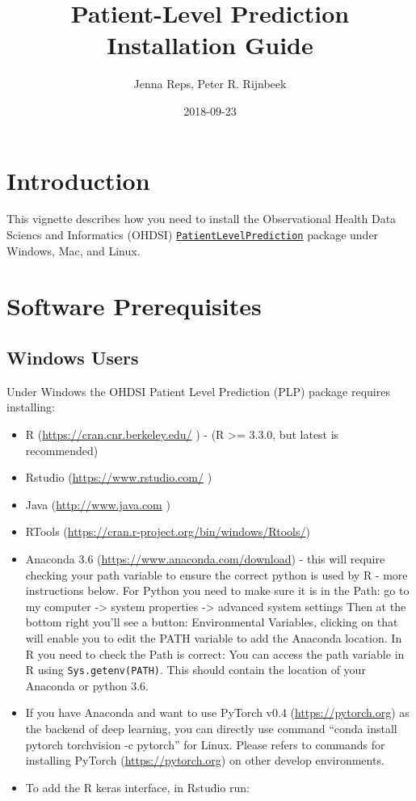 \documentclass[]{article}
\title{Patient-Level Prediction Installation Guide}
\author{Jenna Reps, Peter R. Rijnbeek}
\date{2018-09-23}
\providecommand{\tightlist}{%
  \setlength{\itemsep}{0pt}\setlength{\parskip}{0pt}}
\begin{document}
\maketitle

{
\setcounter{tocdepth}{2}
\tableofcontents
}
\section{Introduction}\label{introduction}

This vignette describes how you need to install the Observational Health
Data Sciencs and Informatics (OHDSI)
\href{http://github.com/OHDSI/PatientLevelPrediction}{\texttt{PatientLevelPrediction}}
package under Windows, Mac, and Linux.

\section{Software Prerequisites}\label{software-prerequisites}

\subsection{Windows Users}\label{windows-users}

Under Windows the OHDSI Patient Level Prediction (PLP) package requires
installing:

\begin{itemize}
\tightlist
\item
  R (\url{https://cran.cnr.berkeley.edu/} ) - (R \textgreater{}= 3.3.0,
  but latest is recommended)
\item
  Rstudio (\url{https://www.rstudio.com/} )
\item
  Java (\url{http://www.java.com} )
\item
  RTools (\url{https://cran.r-project.org/bin/windows/Rtools/})
\item
  Anaconda 3.6 (\url{https://www.anaconda.com/download}) - this will
  require checking your path variable to ensure the correct python is
  used by R - more instructions below. For Python you need to make sure
  it is in the Path: go to my computer -\textgreater{} system properties
  -\textgreater{} advanced system settings Then at the bottom right
  you'll see a button: Environmental Variables, clicking on that will
  enable you to edit the PATH variable to add the Anaconda location. In
  R you need to check the Path is correct: You can access the path
  variable in R using
  \texttt{Sys.getenv(\textquotesingle{}PATH\textquotesingle{})}. This
  should contain the location of your Anaconda or python 3.6.
\item
  If you have Anaconda and want to use PyTorch v0.4
  (\url{https://pytorch.org}) as the backend of deep learning, you can
  directly use command ``conda install pytorch torchvision -c pytorch''
  for Linux. Please refers to commands for installing PyTorch
  (\url{https://pytorch.org}) on other develop environments.
\item
  To add the R keras interface, in Rstudio run:
\end{itemize}
\end{document}
